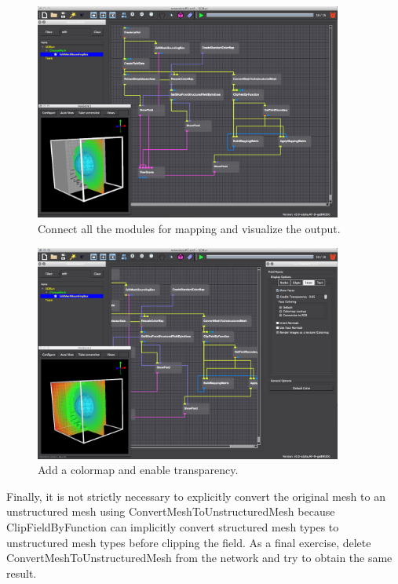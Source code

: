 \documentclass[fleqn,11pt,openany]{book}
\begin{document}
\begin{figure}[H]
\center
\includegraphics[width=0.9\textwidth]{BasicTutorial_figures/view_boundary.png}
\caption{Connect all the modules for mapping and visualize the output.}
\label{fig:viewbound}
\end{figure}

\begin{figure}[H]
\center
\includegraphics[width=0.9\textwidth]{BasicTutorial_figures/finalview.png}
\caption{Add a colormap and enable transparency.}
\label{fig:finalview}
\end{figure}

Finally, it is not strictly necessary to explicitly convert the original mesh to an unstructured mesh using ConvertMeshToUnstructuredMesh because ClipFieldByFunction can implicitly convert structured mesh types to unstructured mesh types before clipping the field.
As a final exercise, delete ConvertMeshToUnstructuredMesh from the network and try to obtain the same result.
\end{document}
